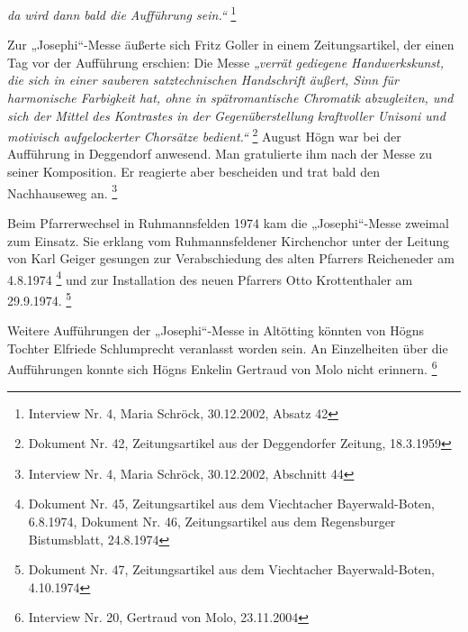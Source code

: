 \documentclass[a4paper]{article}
\newcommand\zitat[1]{\textit{#1}}
\begin{document}
\zitat{da wird dann bald die Aufführung sein.“ }\footnote{
Interview Nr. 4, Maria Schröck, 30.12.2002, Absatz 42}

Zur „Josephi“-Messe äußerte sich Fritz Goller in einem Zeitungsartikel,
der einen Tag vor der Aufführung erschien:\zitat{ }Die
Messe\zitat{ „verrät gediegene Handwerkskunst, die sich in
einer sauberen satztechnischen Handschrift äußert, Sinn für harmonische
Farbigkeit hat, ohne in spätromantische Chromatik abzugleiten, und sich
der Mittel des Kontrastes in der Gegenüberstellung kraftvoller Unisoni
und motivisch aufgelockerter Chorsätze bedient.“ } \footnote{Dokument
Nr. 42, Zeitungsartikel aus der Deggendorfer Zeitung, 18.3.1959} August
Högn war bei der Aufführung in Deggendorf anwesend. Man gratulierte ihm
nach der Messe zu seiner Komposition. Er reagierte aber bescheiden und
trat bald den Nachhauseweg an. \footnote{Interview Nr. 4, Maria
Schröck, 30.12.2002, Abschnitt 44}

Beim Pfarrerwechsel in Ruhmannsfelden 1974 kam die „Josephi“-Messe
zweimal zum Einsatz. Sie erklang vom Ruhmannsfeldener Kirchenchor unter
der Leitung von Karl Geiger gesungen zur Verabschiedung des alten
Pfarrers Reicheneder am 4.8.1974 \footnote{Dokument Nr. 45,
Zeitungsartikel aus dem Viechtacher Bayerwald-Boten, 6.8.1974, Dokument
Nr. 46, Zeitungsartikel aus dem Regensburger Bistumsblatt, 24.8.1974}
und zur Installation des neuen Pfarrers Otto Krottenthaler am
29.9.1974. \footnote{Dokument Nr. 47, Zeitungsartikel aus dem
Viechtacher Bayerwald-Boten, 4.10.1974}

Weitere Aufführungen der „Josephi“-Messe in Altötting könnten von Högns
Tochter Elfriede Schlumprecht veranlasst worden sein. An Einzelheiten
über die Aufführungen konnte sich Högns Enkelin Gertraud von Molo nicht
erinnern. \footnote{Interview Nr. 20, Gertraud von Molo, 23.11.2004}
\end{document}
